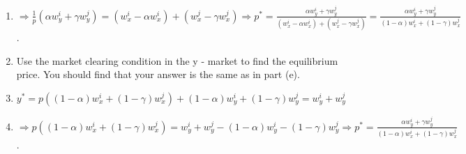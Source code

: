 \documentclass{article}
\begin{document}
\begin{enumerate}
\begin{enumerate}[label=(\alph*)]
\item[] $\Rightarrow\frac{1}{p}(\alpha w_y^i+\gamma w_y^j)=(w_x^i-\alpha w_x^i)+(w_x^j-\gamma w_x^j)\Rightarrow p^*=\frac{\alpha w_y^i+\gamma w_y^j}{(w_x^i-\alpha w_x^i)+(w_x^j-\gamma w_x^j)}=\frac{\alpha w_y^i+\gamma w_y^j}{(1-\alpha)w_x^i+(1-\gamma)w_x^j}$.
\item Use the market clearing condition in the y - market to find the equilibrium price. You should find that your answer is the same as in part (e). 
\item[] $y^*=p((1-\alpha)w_x^i+(1-\gamma)w_x^j)+(1-\alpha)w_y^i+(1-\gamma)w_y^j=w_y^i+w_y^j$
\item[] $\Rightarrow p((1-\alpha)w_x^i+(1-\gamma)w_x^j)=w_y^i+w_y^j-(1-\alpha)w_y^i-(1-\gamma)w_y^j\Rightarrow p^*=\frac{\alpha w_y^i+\gamma w_y^j}{(1-\alpha)w_x^i+(1-\gamma)w_x^j}$.

\end{enumerate}
\end{enumerate}
\end{document}

